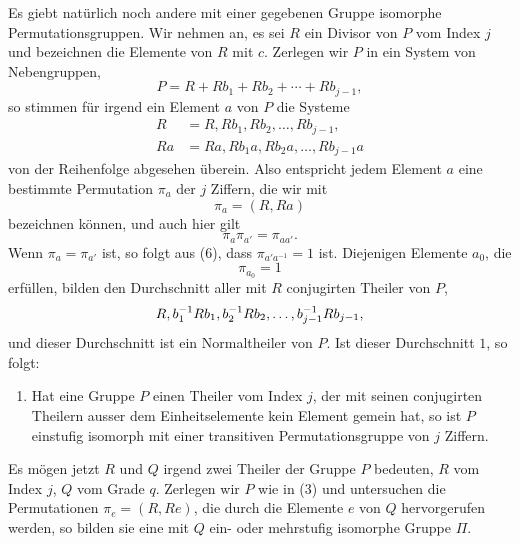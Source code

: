 \documentclass[11pt]{article}
\begin{document}
Es giebt natürlich noch andere mit einer gegebenen Gruppe isomorphe Permutationsgruppen. Wir nehmen an, es sei $R$ ein Divisor von $P$ vom Index $j$ und bezeichnen die Elemente von $R$ mit $c$. Zerlegen wir $P$ in ein System von Nebengruppen,
\begin{equation}
P=R+Rb_1+Rb_2+\cdots+Rb_{j-1},
\tag{3}
\end{equation}
so stimmen für irgend ein Element $a$ von $P$ die Systeme
\begin{equation}
\begin{aligned}
R&=R,Rb_1,Rb_2,\ldots,Rb_{j-1},\\
Ra&=Ra,Rb_1a,Rb_2a,\ldots,Rb_{j-1}a
\end{aligned}
\tag{4}
\end{equation}
von der Reihenfolge abgesehen überein. Also entspricht jedem Element $a$ eine bestimmte Permutation $\pi_a$ der $j$ Ziffern, die wir mit
\begin{equation}
\pi_a=(R,Ra)
\tag{5}
\end{equation}
bezeichnen können, und auch hier gilt
\begin{equation}
\pi_a\pi_{a'}=\pi_{aa'}.
\tag{6}
\end{equation}
Wenn $\pi_a=\pi_{a'}$ ist, so folgt aus (6), dass $\pi_{a'a^{-1}}=1$ ist. Diejenigen Elemente $a_0$, die
\begin{equation}
\pi_{a_0}=1
\tag{7}
\end{equation}
erfüllen, bilden den Durchschnitt aller mit $R$ conjugirten Theiler von $P$,
\[
R,\\ b_1^{-1}Rb_1,\\ b_2^{-1}Rb_2,\ldots,b_{j-1}^{-1}Rb_{j-1},
\]
und dieser Durchschnitt ist ein Normaltheiler von $P$. Ist dieser Durchschnitt $1$, so folgt:
\begin{enumerate}[label=\arabic*.,leftmargin=2.2em,start=2]
\item Hat eine Gruppe $P$ einen Theiler vom Index $j$, der mit seinen conjugirten Theilern ausser dem Einheitselemente kein Element gemein hat, so ist $P$ einstufig isomorph mit einer transitiven Permutationsgruppe von $j$ Ziffern.
\end{enumerate}

Es mögen jetzt $R$ und $Q$ irgend zwei Theiler der Gruppe $P$ bedeuten, $R$ vom Index $j$, $Q$ vom Grade $q$. Zerlegen wir $P$ wie in (3) und untersuchen die Permutationen $\pi_e=(R,Re)$, die durch die Elemente $e$ von $Q$ hervorgerufen werden, so bilden sie eine mit $Q$ ein- oder mehrstufig isomorphe Gruppe $\Pi$.
\end{document}
